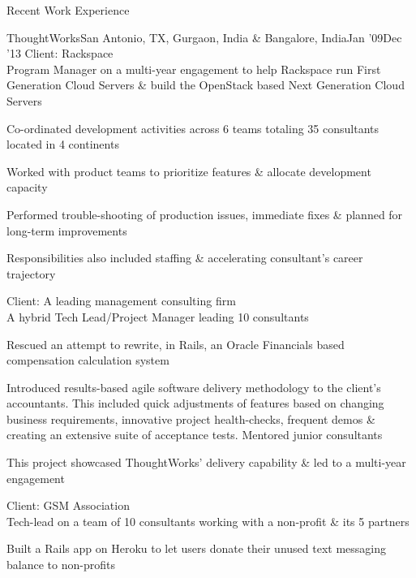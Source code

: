 \documentclass{resume} %
\begin{document}
\begin{rSection}{Recent Work Experience}
  \begin{rSubsection}{ThoughtWorks}{San Antonio, TX, Gurgaon, India \& Bangalore, India}{Jan '09}{Dec '13}
    {Client: Rackspace
      \\Program Manager on a multi-year engagement to help Rackspace run
  First Generation Cloud Servers \& build the OpenStack based Next
  Generation Cloud Servers}

\item Co-ordinated development activities across 6 teams
  totaling 35 consultants located in 4 continents
\item Worked with product teams to prioritize features \& allocate development capacity
\item Performed trouble-shooting of production issues, immediate fixes \& planned for long-term improvements
\item Responsibilities also included staffing \& accelerating consultant's career trajectory
\end{rSubsection}\vspace{-1em}


\begin{rSubsection}{}{}{}{}
  {Client: A leading management consulting firm
    \\A hybrid Tech Lead/Project Manager leading 10 consultants}

\item Rescued an attempt to rewrite, in Rails, an Oracle Financials based compensation calculation system
\item Introduced results-based agile software delivery
  methodology to the client's accountants. This included quick
  adjustments of features based on changing business requirements, innovative
  project health-checks, frequent demos \& creating an extensive suite
  of acceptance tests. Mentored junior consultants
\item This project showcased ThoughtWorks' delivery capability \& led to a multi-year engagement

\end{rSubsection}\vspace{-1em}


\begin{rSubsection}{}{}{}{}{Client: GSM Association\\Tech-lead on a team of 10 consultants working with a non-profit
  \& its 5 partners}
\item Built a Rails app on Heroku to let users donate their unused text messaging balance to non-profits


\end{rSubsection}
\end{rSection}
\end{document}
